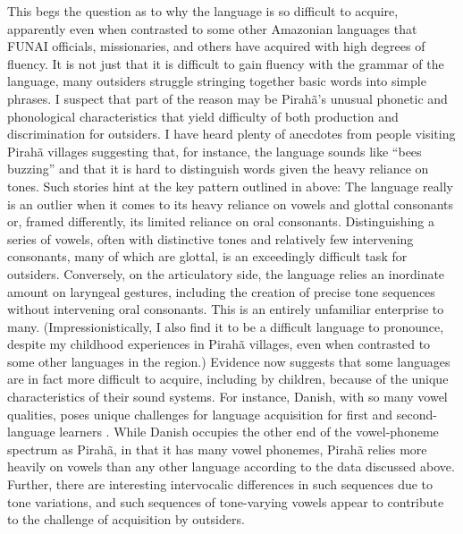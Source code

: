 \documentclass[output=paper,colorlinks,citecolor=brown
]{langscibook}
\begin{document}
    This begs the question as to why the language is so difficult to acquire, apparently even when contrasted to some other Amazonian languages that FUNAI officials, missionaries, and others have acquired with high degrees of fluency. It is not just that it is difficult to gain fluency with the grammar of the language, many outsiders struggle stringing together basic words into simple phrases. I suspect that part of the reason may be Pirahã’s unusual phonetic and phonological characteristics that yield difficulty of both production and discrimination for outsiders. I have heard plenty of anecdotes from people visiting Pirahã villages suggesting that, for instance, the language sounds like “bees buzzing” and that it is hard to distinguish words given the heavy reliance on tones. Such stories hint at the key pattern outlined in  above: The language really is an outlier when it comes to its heavy reliance on vowels and glottal consonants or, framed differently, its limited reliance on oral consonants. Distinguishing a series of vowels, often with distinctive tones and relatively few intervening consonants, many of which are glottal, is an exceedingly difficult task for outsiders. Conversely, on the articulatory side, the language relies an inordinate amount on laryngeal gestures, including the creation of precise tone sequences without intervening oral consonants. This is an entirely unfamiliar enterprise to many. (Impressionistically, I also find it to be a difficult language to pronounce, despite my childhood experiences in Pirahã villages, even when contrasted to some other languages in the region.) Evidence now suggests that some languages are in fact more difficult to acquire, including by children, because of the unique characteristics of their sound systems. For instance, Danish, with so many vowel qualities, poses unique challenges for language acquisition for first and second-language learners \citep{trecca2021danish}. While Danish occupies the other end of the vowel-phoneme spectrum as Pirahã, in that it has many vowel phonemes, Pirahã relies more heavily on vowels than any other language according to the data discussed above. Further, there are interesting intervocalic differences in such sequences due to tone variations, and such sequences of tone-varying vowels appear to contribute to the challenge of acquisition by outsiders.
    
\end{document}
